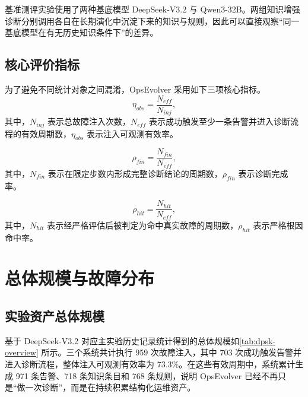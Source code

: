 基准测评实验使用了两种基底模型 DeepSeek-V3.2 与 Qwen3-32B。两组知识增强诊断分别调用各自在长期演化中沉淀下来的知识与规则，因此可以直接观察“同一基底模型在有无历史知识条件下”的差异。

\subsection{核心评价指标}

为了避免不同统计对象之间混淆，OpsEvolver 采用如下三项核心指标。
\begin{equation}
    \label{eq:obs-rate}
    \eta_{obs} = \frac{N_{eff}}{N_{inj}},
\end{equation}
其中，$N_{inj}$ 表示总故障注入次数，$N_{eff}$ 表示成功触发至少一条告警并进入诊断流程的有效周期数，$\eta_{obs}$ 表示注入可观测有效率。

\begin{equation}
    \label{eq:finish-rate}
    \rho_{fin} = \frac{N_{fin}}{N_{eff}},
\end{equation}
其中，$N_{fin}$ 表示在限定步数内形成完整诊断结论的周期数，$\rho_{fin}$ 表示诊断完成率。

\begin{equation}
    \label{eq:hit-rate}
    \rho_{hit} = \frac{N_{hit}}{N_{eff}},
\end{equation}
其中，$N_{hit}$ 表示经严格评估后被判定为命中真实故障的周期数，$\rho_{hit}$ 表示严格根因命中率。

\section{总体规模与故障分布}
\label{sec:exp_scale}

\subsection{实验资产总体规模}

基于 DeepSeek-V3.2 对应主实验历史记录统计得到的总体规模如\autoref{tab:dpsk-overview} 所示。三个系统共计执行 959 次故障注入，其中 703 次成功触发告警并进入诊断流程，整体注入可观测有效率为 73.3\%。在这些有效周期中，系统累计生成 971 条告警、718 条知识条目和 768 条规则，说明 OpsEvolver 已经不再只是“做一次诊断”，而是在持续积累结构化运维资产。

